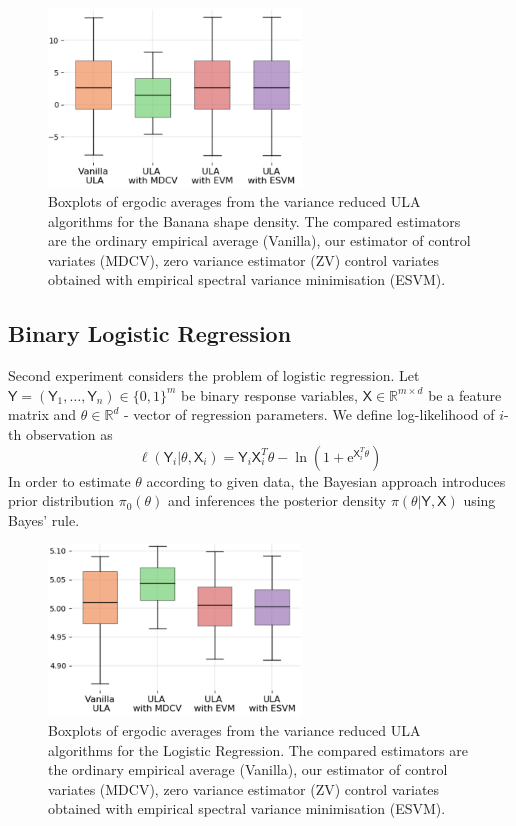 \documentclass[bj]{imsart}
\def\rset{\mathbb{R}}
\def\rme{\mathrm{e}}
\def\rset{\mathbb{R}}
\begin{document}
\begin{figure}[h]
\begin{center}
\includegraphics[width=0.6\textwidth]{../pictures/banana_shape.png}
\caption{Boxplots of ergodic averages  from the variance reduced ULA algorithms for the Banana shape density. The compared estimators are the ordinary empirical average (Vanilla), our estimator of control variates (MDCV), zero variance estimator (ZV) control variates obtained with empirical spectral variance minimisation (ESVM).
\label{fig:banana_shape}}
\end{center}
\end{figure}

\subsection{Binary Logistic Regression}
Second experiment considers the problem of logistic regression. Let $\mathsf{Y} = \left(\mathsf{Y}_1,\ldots,\mathsf{Y}_n\right) \in \{0,1\}^m$ be binary response variables, $\mathsf{X} \in \rset^{m \times d}$ be a feature matrix and $\theta \in \rset^d$ - vector of regression parameters. We define log-likelihood of $i$-th observation as
\[
\ell(\mathsf{Y}_i | \theta, \mathsf{X}_i) = \mathsf{Y}_i \mathsf{X}_i^T\theta - \ln{\left(1 + \rme^{\mathsf{X}_i^T\theta}\right)}
\]
In order to estimate $\theta$ according to given data, the Bayesian approach introduces prior distribution $\pi_0(\theta)$ and inferences the posterior density $\pi(\theta| \mathsf{Y}, \mathsf{X})$ using Bayes' rule.

\begin{figure}[h]
\begin{center}
\includegraphics[width=0.6\textwidth]{../pictures/logreg_1st_order.png}
\caption{Boxplots of ergodic averages  from the variance reduced ULA algorithms for the Logistic Regression. The compared estimators are the ordinary empirical average (Vanilla), our estimator of control variates (MDCV), zero variance estimator (ZV) control variates obtained with empirical spectral variance minimisation (ESVM).
 \label{fig:2}}
\end{center}
\end{figure}
\end{document}

